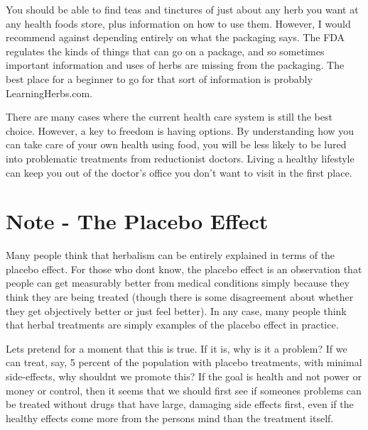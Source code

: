 \documentclass[letterpaper]{article}
\begin{document}
{\color{black}
You should be able to find teas and tinctures of just about any herb
\textcolor[rgb]{0.32941177,0.5529412,0.83137256}{you want at any health
foods store, plus information on how to use them}. However, I would
recommend against depending entirely on what the packaging says. The
FDA regulates the kinds of things that can go on a package, and so
sometimes important information and uses of herbs are missing from the
packaging. The best place for a beginner to go for that sort of
information is probably LearningHerbs.com.}

{\color{black}
There are many cases where the current health care system is still the
best choice. However, a key to freedom is having options. By
understanding how you can take care of your own health using food, you
will be less likely to be lured into problematic treatments from
reductionist doctors. 
\textcolor[rgb]{0.32941177,0.5529412,0.83137256}{Living a healthy
lifestyle can keep you out of the doctor’s office you don’t want to
visit in the first place.}}

\section{Note - The Placebo Effect}
{\color{black}
Many people think that herbalism can be entirely explained in terms of
the placebo effect. For those who don{\textquotesingle}t know, the
placebo effect is an observation that people can get measurably better
from medical conditions simply because they think they are being
treated (though there is some disagreement about whether they get
objectively better or just feel better). In any case, many people think
that herbal treatments are simply examples of the placebo effect in
practice. }

{\color{black}
Let{\textquotesingle}s pretend for a moment that this is true. If
\textcolor[rgb]{0.32941177,0.5529412,0.83137256}{it is}, why is
\textcolor[rgb]{0.32941177,0.5529412,0.83137256}{it} a problem?  If we
can treat, say, 5 percent of the population with placebo treatments,
with minimal side-effects, why shouldn{\textquotesingle}t we promote
this?  If the goal is health and not power or money or control, then it
seems that we should first see if someone{\textquotesingle}s problems
can be treated without drugs
\textcolor[rgb]{0.32941177,0.5529412,0.83137256}{that have} large,
damaging side effects first, even if the healthy effects come more from
the person{\textquotesingle}s mind than the treatment itself.}
\end{document}
